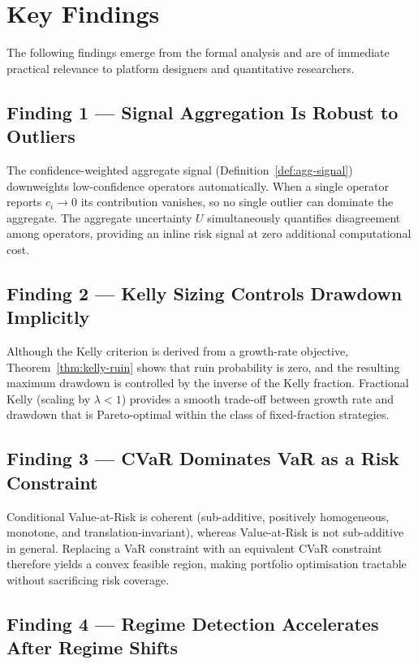 \documentclass[12pt,openany]{book}
\numberwithin{equation}{chapter}
\theoremstyle{plain}
\theoremstyle{definition}
\theoremstyle{remark}
\newenvironment{keyfindings}{%
  \chapter*{Key Findings}
}{%
}
\numberwithin{equation}{chapter}
\theoremstyle{plain}
\begin{document}
\begin{keyfindings}
\label{ch:key-findings}

The following findings emerge from the formal analysis and are of
immediate practical relevance to platform designers and quantitative
researchers.

\section*{Finding 1 — Signal Aggregation Is Robust to Outliers}

The confidence-weighted aggregate signal (Definition~\ref{def:agg-signal})
downweights low-confidence operators automatically.  When a single
operator reports $c_i \to 0$ its contribution vanishes, so no single
outlier can dominate the aggregate.  The aggregate uncertainty
$U$ simultaneously quantifies disagreement among operators, providing
an inline risk signal at zero additional computational cost.

\section*{Finding 2 — Kelly Sizing Controls Drawdown Implicitly}

Although the Kelly criterion is derived from a growth-rate objective,
Theorem~\ref{thm:kelly-ruin} shows that ruin probability is zero,
and the resulting maximum drawdown is controlled by the inverse of
the Kelly fraction.  Fractional Kelly (scaling by $\lambda < 1$)
provides a smooth trade-off between growth rate and drawdown that
is Pareto-optimal within the class of fixed-fraction strategies.

\section*{Finding 3 — CVaR Dominates VaR as a Risk Constraint}

Conditional Value-at-Risk is coherent (sub-additive, positively
homogeneous, monotone, and translation-invariant), whereas
Value-at-Risk is not sub-additive in general.  Replacing a VaR
constraint with an equivalent CVaR constraint therefore yields a
convex feasible region, making portfolio optimisation tractable
without sacrificing risk coverage.

\section*{Finding 4 — Regime Detection Accelerates After Regime Shifts}


\end{keyfindings}
\end{document}
